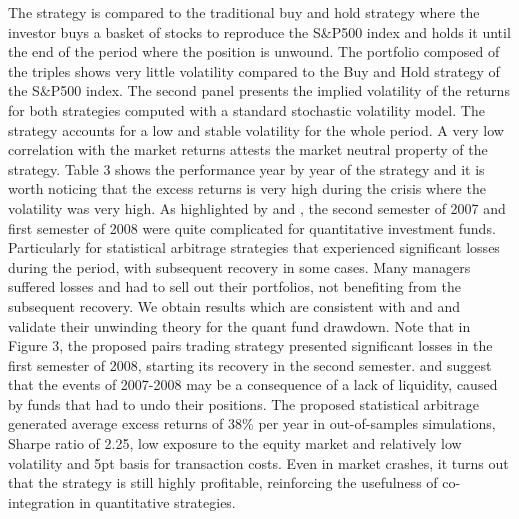 \documentclass[11pt,a4,twosided,singlespacing,titlepagenumber=on]{scrreprt}
\numberwithin{equation}{chapter} %
\theoremstyle{remark}
\begin{document}
The strategy is compared to the traditional buy and hold strategy where the investor buys a basket of stocks to reproduce the S\&P500 index and holds it until the end of the period where the position is unwound. The portfolio composed of the triples shows very little volatility compared to the Buy and Hold strategy of the S\&P500 index. The second panel presents the implied volatility of the returns for both strategies computed with a standard stochastic volatility model. The strategy accounts for a low and stable volatility for the whole period. A very low correlation with the market returns attests the market neutral property of the strategy. Table 3 shows the performance year by year of the strategy and it is worth noticing that the excess returns is very high during the crisis where the volatility was very high. As highlighted by \cite{khandani2007} and \cite{avellaneda2010}, the second semester of 2007 and first semester of 2008 were quite complicated for quantitative investment funds. Particularly for statistical arbitrage strategies that experienced significant losses during the period, with subsequent recovery in some cases. Many managers suffered losses and had to sell out their portfolios, not benefiting from the subsequent recovery. We obtain results which are consistent with \cite{khandani2007} and \cite{avellaneda2010} and validate their unwinding theory for the quant fund drawdown. Note that in Figure 3, the proposed pairs trading strategy presented significant losses in the first semester of 2008, starting its recovery in the second semester. \cite{khandani2007} and \cite{avellaneda2010} suggest that the events of 2007-2008 may be a consequence of a lack of liquidity, caused by funds that had to undo their positions. The proposed statistical arbitrage generated average excess returns of 38\% per year in out-of-samples simulations, Sharpe ratio of 2.25, low exposure to the equity market and relatively low volatility and 5pt basis for transaction costs. Even in market crashes, it turns out that the strategy is still highly profitable, reinforcing the usefulness of co-integration in quantitative strategies.

\cleardoublepage
{}
{} %



\end{document}
